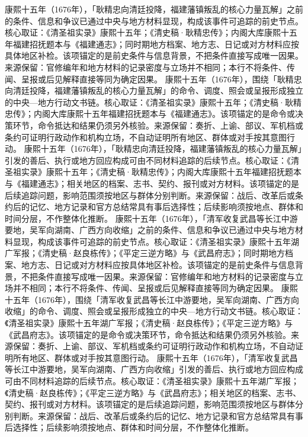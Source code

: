 康熙十五年（1676年），「耿精忠向清廷投降，福建藩镇叛乱的核心力量瓦解」之前的条件、信息和争议已通过中央与地方材料显现，构成该事件可追踪的前史节点。核心取证：《清圣祖实录》康熙十五年；《清史稿·耿精忠传》；内阁大库康熙十五年福建招抚题本与《福建通志》；同时期地方档案、地方志、日记或对方材料应按具体地区补检。该项锚定的是前史条件与信息背景，不把条件直接写成唯一因果。来源保留：官修编年和地方材料的记录密度与立场并不相同；本行不将条件、传闻、呈报或后见解释直接等同为确定因果。
康熙十五年（1676年），围绕「耿精忠向清廷投降，福建藩镇叛乱的核心力量瓦解」的命令、调度、照会或呈报形成独立的中央—地方行动文书链。核心取证：《清圣祖实录》康熙十五年；《清史稿·耿精忠传》；内阁大库康熙十五年福建招抚题本与《福建通志》。该项锚定的是命令或决策环节，命令抵达和结果仍须另外核验。来源保留：奏折、上谕、部议、军机档或条约可证明行政动作和机构立场，不自动证明所有地区、群体或对手按其意图行动。
康熙十五年（1676年），「耿精忠向清廷投降，福建藩镇叛乱的核心力量瓦解」引发的善后、执行或地方回应构成可由不同材料追踪的后续节点。核心取证：《清圣祖实录》康熙十五年；《清史稿·耿精忠传》；内阁大库康熙十五年福建招抚题本与《福建通志》；相关地区的档案、志书、契约、报刊或对方材料。该项锚定的是后续追踪问题，影响范围须按地区与群体分别判断。来源保留：战后、改革后或条约后的记忆、地方记录和官方总结常具有事后选择性；后续影响须按地点、群体和时间分层，不作整体化推断。
康熙十五年（1676年），「清军收复武昌等长江中游要地，吴军向湖南、广西方向收缩」之前的条件、信息和争议已通过中央与地方材料显现，构成该事件可追踪的前史节点。核心取证：《清圣祖实录》康熙十五年湖广军报；《清史稿·赵良栋传》；《平定三逆方略》与《武昌府志》；同时期地方档案、地方志、日记或对方材料应按具体地区补检。该项锚定的是前史条件与信息背景，不把条件直接写成唯一因果。来源保留：官修编年和地方材料的记录密度与立场并不相同；本行不将条件、传闻、呈报或后见解释直接等同为确定因果。
康熙十五年（1676年），围绕「清军收复武昌等长江中游要地，吴军向湖南、广西方向收缩」的命令、调度、照会或呈报形成独立的中央—地方行动文书链。核心取证：《清圣祖实录》康熙十五年湖广军报；《清史稿·赵良栋传》；《平定三逆方略》与《武昌府志》。该项锚定的是命令或决策环节，命令抵达和结果仍须另外核验。来源保留：奏折、上谕、部议、军机档或条约可证明行政动作和机构立场，不自动证明所有地区、群体或对手按其意图行动。
康熙十五年（1676年），「清军收复武昌等长江中游要地，吴军向湖南、广西方向收缩」引发的善后、执行或地方回应构成可由不同材料追踪的后续节点。核心取证：《清圣祖实录》康熙十五年湖广军报；《清史稿·赵良栋传》；《平定三逆方略》与《武昌府志》；相关地区的档案、志书、契约、报刊或对方材料。该项锚定的是后续追踪问题，影响范围须按地区与群体分别判断。来源保留：战后、改革后或条约后的记忆、地方记录和官方总结常具有事后选择性；后续影响须按地点、群体和时间分层，不作整体化推断。
